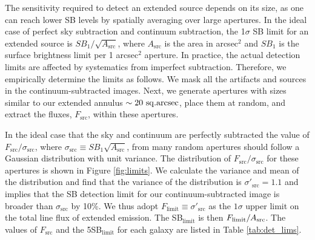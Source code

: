 \documentclass[twocolumn]{aastex61}
\begin{document}
The sensitivity required to detect an extended source depends on its size, as one can reach lower SB levels by spatially averaging over large apertures. In the ideal case of perfect sky subtraction and continuum subtraction, the 1$\sigma$ SB limit for an extended source is $SB_{1}/\sqrt{A_\text{src}}$, where $A_\text{src}$ is the area in arcsec$^2$ and $SB_{1}$ is the surface brightness limit per 1 arcsec$^2$ aperture. In practice, the actual detection limits are affected by systematics from imperfect subtraction. Therefore, we empirically determine the limits as follows. We mask all the artifacts and sources in the continuum-subtracted images. Next, we generate apertures with sizes similar to our extended annulus $\sim 20 \rm\ sq.arcsec$, place them at random, and extract the fluxes, $F_{\text{src}}$, within these apertures.

 In the ideal case that the sky and continuum are perfectly subtracted the value of $F_{\text{src}}/ \sigma_{\text{src}}$, where $\sigma_{\text{src}} \equiv SB_{1}\sqrt{A_\text{src}}$, from many random apertures should follow a Gaussian distribution with unit variance. The distribution of $F_{\text{src}}/\sigma_{\text{src}}$ for these apertures is shown in Figure \ref{fig:limits}. We calculate the variance and mean of the distribution and find that the variance of the distribution is $\sigma'_{\text{src}}=1.1$ and implies that the SB detection limit for our continuum-subtracted image is broader than $\sigma_{\text{src}}$ by 10\%. We thus adopt $F_{\text{limit}} \equiv \sigma'_{\text{src}}$  as the $1 \sigma$ upper limit on the total line flux of extended  emission. The SB$_{\text{limit}}$ is then $F_{\text{limit}}/A_{\rm{src}}$. The values of $F_{\text{src}}$ and the 5SB$_{\text{limit}}$ for each galaxy are listed in Table \ref{tab:det_lims}.
\end{document}
